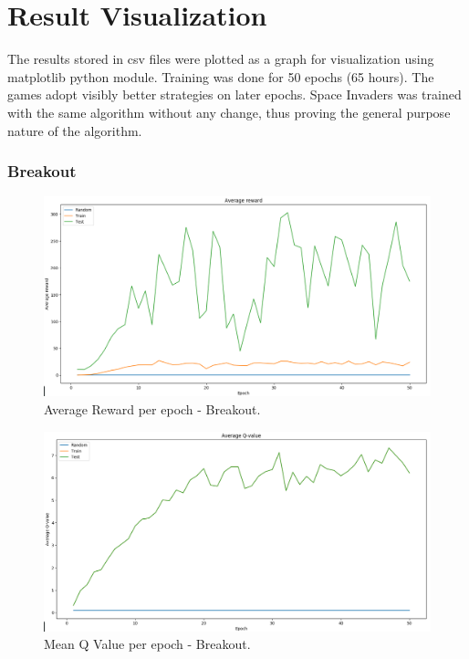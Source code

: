 \documentclass[a4paper,12pt]{report}
\begin{document}
		\section{Result Visualization}

			The results stored in csv files were plotted as a graph for visualization using matplotlib python module. Training was done for 50 epochs (65 hours). The games adopt visibly better strategies on later epochs. Space Invaders was trained with the same algorithm without any change, thus proving the general purpose nature of the algorithm.
			
			\newpage
			\subsubsection{Breakout}

			\begin{figure}[H]
				\begin{centering}
					\includegraphics[width=15cm]{images/breakout_1_average_reward.png}
					\caption{Average Reward per epoch - Breakout.}
				\end{centering}
			\end{figure}			
			
			\begin{figure}[H]
				\begin{centering}
					\includegraphics[width=15cm]{images/breakout_2_meanq.png}
					\caption{Mean Q Value per epoch - Breakout.}
				\end{centering}
			\end{figure}			
			
\end{document}
